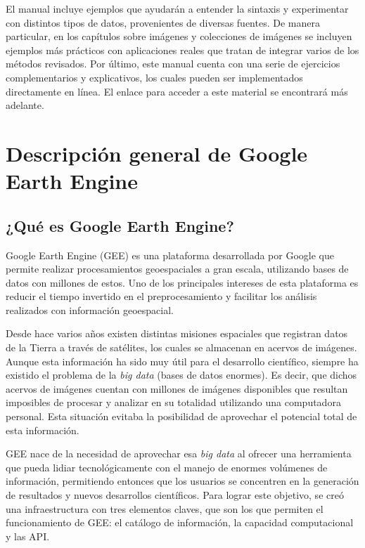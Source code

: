 \documentclass[
  12pt,
  letterpaper,
  twoside]{book}
\begin{document}
El manual incluye ejemplos que ayudarán a entender la sintaxis y experimentar con distintos tipos de datos, provenientes de diversas fuentes. De manera particular, en los capítulos sobre imágenes y colecciones de imágenes se incluyen ejemplos más prácticos con aplicaciones reales que tratan de integrar varios de los métodos revisados. Por último, este manual cuenta con una serie de ejercicios complementarios y explicativos, los cuales pueden ser implementados directamente en línea. El enlace para acceder a este material se encontrará más adelante.

\hypertarget{descripciuxf3n-general-de-google-earth-engine}{%
\section{Descripción general de Google Earth Engine}\label{descripciuxf3n-general-de-google-earth-engine}}

\hypertarget{quuxe9-es-google-earth-engine}{%
\subsection*{¿Qué es Google Earth Engine?}\label{quuxe9-es-google-earth-engine}}

Google Earth Engine (GEE) es una plataforma desarrollada por Google que permite realizar procesamientos geoespaciales a gran escala, utilizando bases de datos con millones de estos. Uno de los principales intereses de esta plataforma es reducir el tiempo invertido en el preprocesamiento y facilitar los análisis realizados con información geoespacial.

Desde hace varios años existen distintas misiones espaciales que registran datos de la Tierra a través de satélites, los cuales se almacenan en acervos de imágenes. Aunque esta información ha sido muy útil para el desarrollo científico, siempre ha existido el problema de la \emph{big data} (bases de datos enormes). Es decir, que dichos acervos de imágenes cuentan con millones de imágenes disponibles que resultan imposibles de procesar y analizar en su totalidad utilizando una computadora personal. Esta situación evitaba la posibilidad de aprovechar el potencial total de esta información.

GEE nace de la necesidad de aprovechar esa \emph{big data} al ofrecer una herramienta que pueda lidiar tecnológicamente con el manejo de enormes volúmenes de información, permitiendo entonces que los usuarios se concentren en la generación de resultados y nuevos desarrollos científicos. Para lograr este objetivo, se creó una infraestructura con tres elementos claves, que son los que permiten el funcionamiento de GEE: el catálogo de información, la capacidad computacional y las API.
\end{document}
